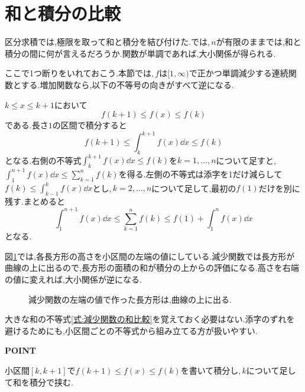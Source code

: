 \section{和と積分の比較}\label{節:和と積分の比較}

区分求積では,極限を取って和と積分を結び付けた.では,\,$n$が有限のままでは,和と積分の間に何が言えるだろうか.関数が単調であれば,大小関係が得られる.

ここで1つ断りをいれておこう.本節では,\,$f$は$[1,\infty)$で正かつ単調減少する連続関数とする.増加関数なら,以下の不等号の向きがすべて逆になる.

$k\le x\le k+1$において
\[
 f(k+1)\le f(x)\le f(k)
\]
である.長さ$1$の区間で積分すると
\[
 f(k+1)\le\int_k^{k+1}f(x)\dd x\le f(k)
\]
となる.右側の不等式$\int_k^{k+1}f(x)\dd x\le f(k)$を$k=1,\ldots,n$について足すと,\,$\int_1^{n+1}f(x)\dd x\le\sum_{k=1}^{n}f(k)$を得る.左側の不等式は添字を1だけ減らして$f(k)\le\int_{k-1}^{k}f(x)\dd x$とし,\,$k=2,\ldots,n$について足して,最初の$f(1)$だけを別に残す.まとめると
\begin{equation}\label{式:減少関数の和比較}
 \int_1^{n+1}f(x)\dd x
 \le\sum_{k=1}^{n}f(k)
 \le f(1)+\int_1^{n}f(x)\dd x
\end{equation}
となる.

図\ref{図:和と積分の比較}では,各長方形の高さを小区間の左端の値にしている.減少関数では長方形が曲線の上に出るので,長方形の面積の和が積分の上からの評価になる.高さを右端の値に変えれば,大小関係が逆になる.

\begin{figure}[htbp]
 \centering
 \caption{減少関数の左端の値で作った長方形は,曲線の上に出る.}
 \label{図:和と積分の比較}
\end{figure}

大きな和の不等式\eqref{式:減少関数の和比較}を覚えておく必要はない.添字のずれを避けるためにも,小区間ごとの不等式から組み立てる方が扱いやすい.

\begin{bookpoint}
\textbf{POINT}\par
小区間$[k,k+1]$で$f(k+1)\le f(x)\le f(k)$を書いて積分し,\,$k$について足して和を積分で挟む.
\end{bookpoint}

